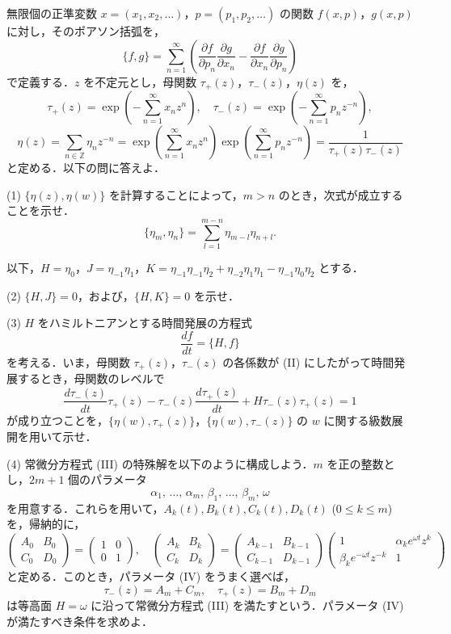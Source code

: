 \documentclass[12pt]{jlreq}
\begin{document}
無限個の正準変数 \(x = (x_1, x_2, \dots)\)，\(p = (p_1, p_2, \dots)\) の関数 \(f(x,p)\)，\(g(x,p)\) に対し，そのポアソン括弧を，
\[
  \{f,g\} = \sum_{n=1}^\infty \left( \frac{\partial f}{\partial p_n} \frac{\partial g}{\partial x_n} - \frac{\partial f}{\partial x_n} \frac{\partial g}{\partial p_n} \right)
\]
で定義する．\(z\) を不定元とし，母関数 \(\tau_+(z)\)，\(\tau_-(z)\)，\(\eta(z)\) を，
\[
  \tau_+(z) = \exp\left( - \sum_{n=1}^\infty x_n z^n \right),\quad \tau_-(z) = \exp\left( - \sum_{n=1}^\infty p_n z^{-n} \right),
\]
\[
  \eta(z) = \sum_{n\in\mathbb{Z}} \eta_n z^{-n} = \exp\left( \sum_{n=1}^\infty x_n z^n \right) \exp\left( \sum_{n=1}^\infty p_n z^{-n} \right) = \frac{1}{\tau_+(z)\tau_-(z)}
\]
と定める．以下の問に答えよ．

(1) \(\{\eta(z), \eta(w)\}\) を計算することによって，\(m > n\) のとき，次式が成立することを示せ．
  \[
    \{\eta_m, \eta_n\} = \sum_{l=1}^{m-n} \eta_{m-l}\eta_{n+l}.
  \]

以下，\(H = \eta_0\)，\(J = \eta_{-1}\eta_1\)，\(K = \eta_{-1}\eta_{-1}\eta_2 + \eta_{-2}\eta_1\eta_1 - \eta_{-1}\eta_0\eta_2\) とする．

(2) \(\{H,J\} = 0\)，および，\(\{H,K\} = 0\) を示せ．

(3) \(H\) をハミルトニアンとする時間発展の方程式
  \[
    \frac{df}{dt} = \{H,f\}
  \]
  を考える．いま，母関数 \(\tau_+(z)\)，\(\tau_-(z)\) の各係数が (II) にしたがって時間発展するとき，母関数のレベルで
  \[
    \frac{d\tau_-(z)}{dt}\tau_+(z) - \tau_-(z)\frac{d\tau_+(z)}{dt} + H\tau_-(z)\tau_+(z) = 1
  \]
  が成り立つことを，\(\{\eta(w), \tau_+(z)\}\)，\(\{\eta(w), \tau_-(z)\}\) の \(w\) に関する級数展開を用いて示せ．

(4) 常微分方程式 (III) の特殊解を以下のように構成しよう．\(m\) を正の整数とし，\(2m+1\) 個のパラメータ
  \[
    \alpha_1,\, \dots,\, \alpha_m,\, \beta_1,\, \dots,\, \beta_m,\, \omega
  \]
  を用意する．これらを用いて，\(A_k(t), B_k(t), C_k(t), D_k(t)\) (\(0 \le k \le m\)) を，帰納的に，
  \[
    \begin{pmatrix} A_0 & B_0 \\ C_0 & D_0 \end{pmatrix} = \begin{pmatrix} 1 & 0 \\ 0 & 1 \end{pmatrix},\quad
    \begin{pmatrix} A_k & B_k \\ C_k & D_k \end{pmatrix} =
    \begin{pmatrix} A_{k-1} & B_{k-1} \\ C_{k-1} & D_{k-1} \end{pmatrix}
    \begin{pmatrix} 1 & \alpha_k e^{\omega t} z^k \\ \beta_k e^{-\omega t} z^{-k} & 1 \end{pmatrix}
  \]
  と定める．このとき，パラメータ (IV) をうまく選べば，
  \[
    \tau_-(z) = A_m + C_m,\quad \tau_+(z) = B_m + D_m
  \]
  は等高面 \(H = \omega\) に沿って常微分方程式 (III) を満たすという．パラメータ (IV) が満たすべき条件を求めよ．
\end{document}
